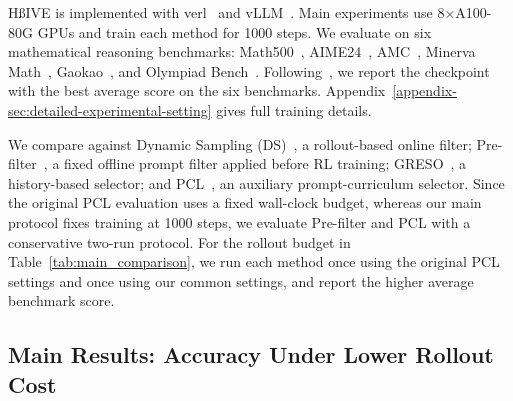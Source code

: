  HßIVE is implemented with verl~\cite{verl2025} and vLLM~\cite{vLLM2023SOSP}. Main experiments use 8$\times$A100-80G GPUs and train each method for 1000 steps. We evaluate on six mathematical reasoning benchmarks: Math500~\cite{hendrycks2021measuringmathematicalproblemsolving}, AIME24~\cite{aops2024aime}, AMC~\cite{aops2024amc}, Minerva Math~\cite{NEURIPS2022_18abbeef}, Gaokao~\cite{zhang2024gaokao}, and Olympiad Bench~\cite{he-etal-2024-olympiadbench}. Following~\cite{zheng2025act}, we report the checkpoint with the best average score on the six benchmarks. Appendix~\ref{appendix-sec:detailed-experimental-setting} gives full training details.

 We compare against Dynamic Sampling (DS)~\cite{yu2025dapo}, a rollout-based online filter; Pre-filter~\cite{Gao2025PCL}, a fixed offline prompt filter applied before RL training; GRESO~\cite{zheng2025act}, a history-based selector; and PCL~\cite{Gao2025PCL}, an auxiliary prompt-curriculum selector. Since the original PCL evaluation uses a fixed wall-clock budget, whereas our main protocol fixes training at 1000 steps, we evaluate Pre-filter and PCL with a conservative two-run protocol. For the rollout budget in Table~\ref{tab:main_comparison}, we run each method once using the original PCL settings and once using our common settings, and report the higher average benchmark score. %

\subsection{Main Results: Accuracy Under Lower Rollout Cost}
\label{subsec:main-experiment}
% 


